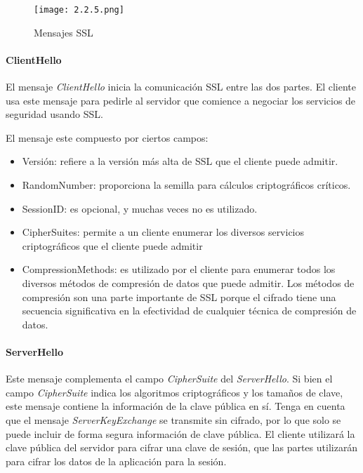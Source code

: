 \begin{center}
   \begin{figure}   
      \begin{center}
         \texttt{[image: 2.2.5.png]}
      \end{center}
      \caption{Mensajes SSL}
   \end{figure}
\end{center}


\paragraph*{ClientHello}
El mensaje \emph{ClientHello} inicia la comunicación SSL entre las dos partes. 
El cliente usa este mensaje para pedirle al servidor que comience a 
negociar los servicios de seguridad usando SSL.

El mensaje este compuesto por ciertos campos: 
\begin{itemize}
   \setlength\itemsep{-0.6em}
   \item Versión: refiere a la versión más alta de SSL que el cliente 
   puede admitir. 
   \item RandomNumber: proporciona la semilla para cálculos criptográficos
   críticos. 
   \item SessionID: es opcional, y muchas veces no es utilizado. 
   \item CipherSuites: permite a un cliente enumerar los diversos 
   servicios criptográficos que el cliente puede admitir
   \item CompressionMethods: es utilizado por el cliente para enumerar 
   todos los diversos métodos de compresión de datos que puede admitir.
    Los métodos de compresión son una parte importante de SSL porque el 
    cifrado tiene una secuencia significativa en la efectividad de 
    cualquier técnica de compresión de datos. 
\end{itemize}


\paragraph*{ServerHello}
Este mensaje complementa el campo \emph{CipherSuite} del \emph{ServerHello}. Si bien 
el campo \emph{CipherSuite} indica los algoritmos criptográficos y los tamaños 
de clave, este mensaje contiene la información de la clave pública en sí. 
Tenga en cuenta que el mensaje \emph{ServerKeyExchange} se transmite sin cifrado, 
por lo que solo se puede incluir de forma segura información de clave 
pública. El cliente utilizará la clave pública del servidor para cifrar 
una clave de sesión, que las partes utilizarán para cifrar los datos de 
la aplicación para la sesión.

